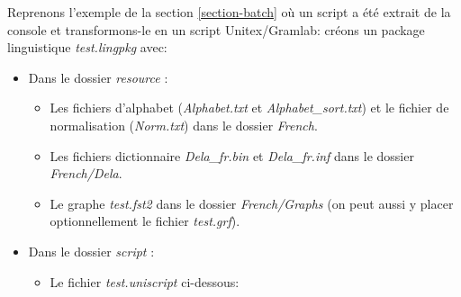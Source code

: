 Reprenons l'exemple de la section \ref{section-batch} où un script a été extrait de la console et transformons-le en un script Unitex/Gramlab: créons un package linguistique \emph{test.lingpkg} avec:
\begin{itemize}
\item Dans le dossier \emph{resource} :
\begin{itemize}
\item Les fichiers d'alphabet (\emph{Alphabet.txt} et \emph{Alphabet\_sort.txt}) et le fichier de normalisation (\emph{Norm.txt}) dans le dossier \emph{French}.
\item Les fichiers dictionnaire \emph{Dela\_fr.bin} et \emph{Dela\_fr.inf} dans le dossier \emph{French/Dela}.
\item Le graphe \emph{test.fst2} dans le dossier \emph{French/Graphs} (on peut aussi y placer optionnellement le fichier \emph{test.grf}).
\end{itemize}
\item Dans le dossier \emph{script} :
\begin{itemize}
\item Le fichier \emph{test.uniscript} ci-dessous:
\end{itemize}
\end{itemize}

